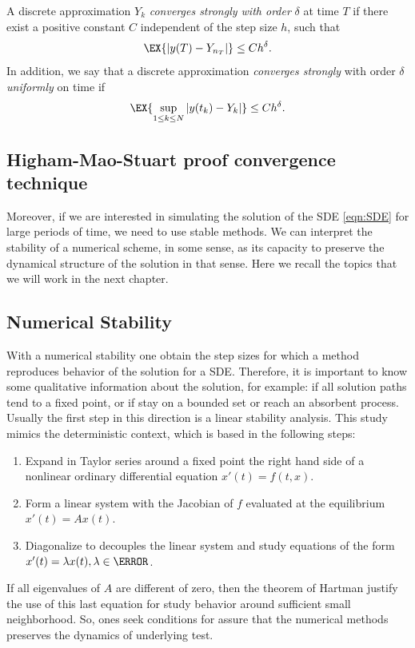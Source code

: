 \begin{definition}[order]
	A discrete approximation $Y_k$ \emph{converges strongly with order} $\delta$ at time $T$ if there exist a positive 
	constant $C$ independent of the step size $h$, such that
	\begin{equation}
	\EX{|y(T)-Y_{n_T}|} \leq C h^\delta.
	\end{equation}
	In addition, we say that a discrete approximation \emph{converges strongly} with order $\delta$ \emph{uniformly} on
	 time if
	\begin{equation}
	\EX{
		\sup_{1 \leq k\leq N}
		|y(t_k)-Y_k|
	}\leq C h^{\delta}.
	\end{equation}
\end{definition}


\subsection{Higham-Mao-Stuart proof convergence technique} \label{sec:HMS-Technique}
	
	Moreover, if we are interested in simulating the solution of the SDE \eqref{eqn:SDE} for large periods of time, 
	we need to use stable methods. We can interpret the stability of a numerical scheme, in some sense, as its
	capacity to preserve the  dynamical structure of the solution in that sense. Here we recall the topics that we will 
	work in the next chapter.
\subsection{Numerical Stability}
	With a numerical stability  one obtain  the step sizes for which a method reproduces  behavior of the solution 
	for a SDE. Therefore, it is important to know some qualitative  information  about the  solution, for example: if 
	all solution paths tend to a fixed point, or  if stay on a bounded set or reach an absorbent process.
	Usually the first step in this direction is a linear stability analysis. This study mimics the deterministic 
	context, which is based in the following steps:
	\begin{enumerate}
		\item 
			Expand in Taylor series around a fixed point the right hand side of a nonlinear ordinary differential 
			equation $x'(t) = f(t,x)$.
		\item
			Form a linear system with the Jacobian of $f$ evaluated at the equilibrium
			$x'(t) = Ax(t)$.
		\item
			Diagonalize to decouples the linear system and study equations of the form
			$x'(t) = \lambda x(t), \lambda \in \C$.
	\end{enumerate}
	If all eigenvalues of $A$ are different of zero, then the  theorem of Hartman justify the use of this last equation 
	for study behavior around sufficient small neighborhood. So, ones 
	seek conditions for assure that the numerical methods preserves the dynamics of underlying test. 
		
